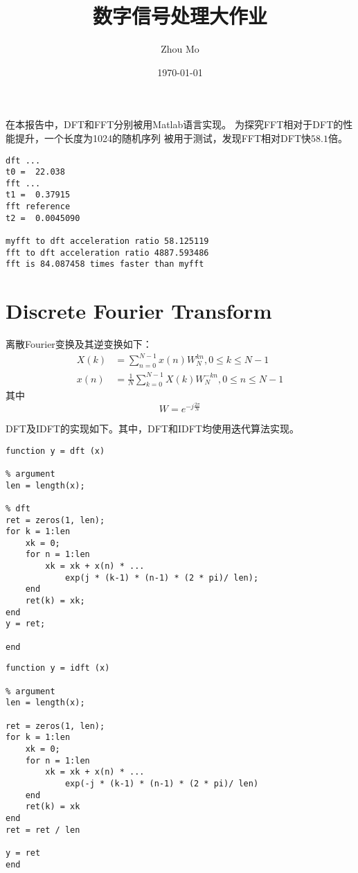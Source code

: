 \documentclass[12pt, a4paper]{article}
\title{数字信号处理大作业}
\author{Zhou Mo}
\date{\today}
\begin{document}
\begin{CJK}{UTF8}{gkai}

\maketitle

在本报告中，DFT和FFT分别被用Matlab语言实现。
为探究FFT相对于DFT的性能提升，一个长度为1024的随机序列
被用于测试，发现FFT相对DFT快$58.1$倍。

\begin{lstlisting}[caption={程序运行结果}]
dft ...
t0 =  22.038
fft ...
t1 =  0.37915
fft reference
t2 =  0.0045090

myfft to dft acceleration ratio 58.125119
fft to dft acceleration ratio 4887.593486
fft is 84.087458 times faster than myfft
\end{lstlisting}

\section{Discrete Fourier Transform}
离散Fourier变换及其逆变换如下：
\begin{align}
X(k) &= \sum_{n=0}^{N-1} x(n)W_N^{kn}, 0 \leq k \leq N-1 \\
x(n) &= \frac{1}{N} \sum_{k=0}^{N-1} X(k)W_N^{-kn}, 0 \leq n \leq N-1
\end{align}
其中\[ W = e^{-j \frac{2\pi}{N}}\]

DFT及IDFT的实现如下。其中，DFT和IDFT均使用迭代算法实现。
\begin{lstlisting}[caption={DFT Program}]
function y = dft (x)

% argument
len = length(x);

% dft
ret = zeros(1, len);
for k = 1:len
    xk = 0;
    for n = 1:len
        xk = xk + x(n) * ...
            exp(j * (k-1) * (n-1) * (2 * pi)/ len);
    end
    ret(k) = xk;
end
y = ret;

end
\end{lstlisting}

\begin{lstlisting}[caption={IDFT Program}]
function y = idft (x)

% argument
len = length(x);

ret = zeros(1, len);
for k = 1:len
    xk = 0;
    for n = 1:len
        xk = xk + x(n) * ...
            exp(-j * (k-1) * (n-1) * (2 * pi)/ len)
    end
    ret(k) = xk
end
ret = ret / len

y = ret
end
\end{lstlisting}


\end{CJK}
\end{document}
